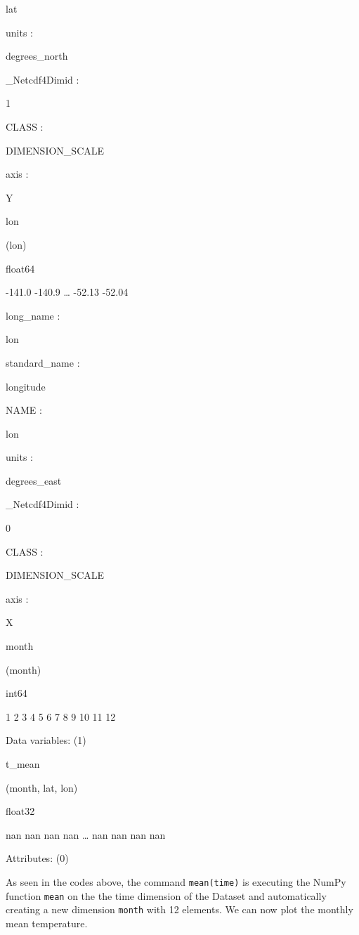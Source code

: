 \documentclass[
]{book}
\begin{document}
lat

{units :}

degrees\_north

\_Netcdf4Dimid :

1

{CLASS :}

DIMENSION\_SCALE

{axis :}

Y

{lon}

(lon)

float64

-141.0 -140.9 \ldots{} -52.13 -52.04

{long\_name :}

lon

{standard\_name :}

longitude

{NAME :}

lon

{units :}

degrees\_east

\_Netcdf4Dimid :

0

{CLASS :}

DIMENSION\_SCALE

{axis :}

X

{month}

(month)

int64

1 2 3 4 5 6 7 8 9 10 11 12

Data variables: {(1)}

{t\_mean}

(month, lat, lon)

float32

nan nan nan nan \ldots{} nan nan nan nan

Attributes: {(0)}

As seen in the codes above, the command \texttt{mean(\textquotesingle{}time\textquotesingle{})} is executing the NumPy function \texttt{mean} on the the time dimension of the Dataset and automatically creating a new dimension \texttt{month} with 12 elements. We can now plot the monthly mean temperature.
\end{document}
